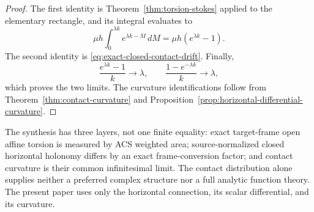 \begin{proof}
The first identity is Theorem~\ref{thm:torsion-stokes} applied to the elementary
rectangle, and its integral evaluates to
\[
    \mu h\int_0^{\lambda k}e^{\lambda k-M}\,dM
       =\mu h(e^{\lambda k}-1).
\]
The second identity is \eqref{eq:exact-closed-contact-drift}.  Finally,
\[
    \frac{e^{\lambda k}-1}{k}\longrightarrow\lambda,
    \qquad
    \frac{1-e^{-\lambda k}}{k}\longrightarrow\lambda,
\]
which proves the two limits.  The curvature identifications follow from
Theorem~\ref{thm:contact-curvature} and
Proposition~\ref{prop:horizontal-differential-curvature}.
\end{proof}

The synthesis has three layers, not one finite equality: exact target-frame open
affine torsion is measured by ACS weighted area; source-normalized closed horizontal
holonomy differs by an exact frame-conversion factor; and contact curvature is their common
infinitesimal limit.  The contact distribution alone supplies neither a
preferred complex structure nor a full analytic function theory.  The present
paper uses only the horizontal connection, its scalar differential, and its
curvature.
